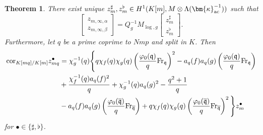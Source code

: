 \documentclass{amsart}
\numberwithin{equation}{section}
\newtheorem{theorem}{Theorem}[section]
\newcommand{\frk}{\mathfrak}
\newcommand{\ac}{\textup{ac}}
\newcommand{\LL}{\Lambda}
\newcommand{\bk}{(\bm{\kappa}_{\ac}^{-1})}
\newcommand{\Fr}{{\rm Fr}}
\begin{document}
\begin{theorem}\label{thm:decompo}
    There exist unique $z_m^\sharp,z_m^\flat\in H^1(K[m],M\otimes\LL\bk)$ such that
    \[
    \begin{bmatrix}
      z_{m,\infty,\alpha}\\  z_{m,\infty,\beta}\end{bmatrix}=Q_g^{-1}M_{\log,g}
\begin{bmatrix}
       z_m^\sharp\\  z_m^\flat
\end{bmatrix}    .
    \]
    Furthermore,  let $q$ be a prime coprime to $Nmp$ and split in $K$. Then
    \begin{align*}
        \mathrm{cor}_{K[mq]/K[m]}z_{m q}^\bullet &= \chi_g^{-1}(q)\Bigg\{ q\chi_f(q)\chi_g(q) \left(\frac{\varphi_0(\frk{q})}{q}\Fr_{\frk{q}}\right)^2 -a_q(f)a_q(g) \left(\frac{\varphi_0(\frk{q})}{q}\Fr_{\frk{q}}\right) \\
        & +\frac{\chi_f^{-1}(q)a_q(f)^2}{q}+ \chi_{g}^{-1}(q)a_{q}(g)^2-\frac{q^2+1}{q} \\
        &-a_q(f)a_q(g) \left(\frac{\varphi_0(\overline{\frk{q}})}{q}\Fr_{\overline{\frk{q}}}\right) +q\chi_f(q)\chi_g(q) \left(\frac{\varphi_0(\overline{\frk{q}})}{q}\Fr_{\overline{\frk{q}}}\right)^2 \Bigg\} z_{m}^\bullet
    \end{align*}
    for $\bullet\in\{\sharp,\flat\}$.
\end{theorem}
\end{document}
